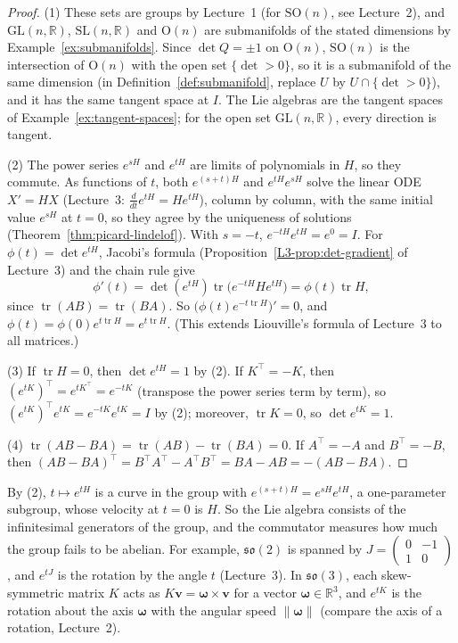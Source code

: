 \documentclass[11pt]{article}
\newcommand{\norm}[1]{\lVert #1 \rVert}
\theoremstyle{definition}
\theoremstyle{plain}
\theoremstyle{remark}
\DeclareMathOperator{\tr}{tr}
\begin{document}
\begin{proof}
    (1) These sets are groups by Lecture~1 (for $\mathrm{SO}(n)$, see Lecture~2), and $\mathrm{GL}(n, \mathbb{R})$, $\mathrm{SL}(n, \mathbb{R})$ and $\mathrm{O}(n)$ are submanifolds of the stated dimensions by Example~\ref{ex:submanifolds}. Since $\det Q = \pm 1$ on $\mathrm{O}(n)$, $\mathrm{SO}(n)$ is the intersection of $\mathrm{O}(n)$ with the open set $\{\det > 0\}$, so it is a submanifold of the same dimension (in Definition~\ref{def:submanifold}, replace $U$ by $U \cap \{\det > 0\}$), and it has the same tangent space at $I$. The Lie algebras are the tangent spaces of Example~\ref{ex:tangent-spaces}; for the open set $\mathrm{GL}(n, \mathbb{R})$, every direction is tangent.

    (2) The power series $e^{sH}$ and $e^{tH}$ are limits of polynomials in $H$, so they commute. As functions of $t$, both $e^{(s+t)H}$ and $e^{tH}e^{sH}$ solve the linear ODE $X' = HX$ (Lecture~3: $\frac{d}{dt}e^{tH} = He^{tH}$), column by column, with the same initial value $e^{sH}$ at $t = 0$, so they agree by the uniqueness of solutions (Theorem~\ref{thm:picard-lindelof}). With $s = -t$, $e^{-tH}e^{tH} = e^0 = I$. For $\phi(t) = \det e^{tH}$, Jacobi's formula (Proposition~\ref{L3-prop:det-gradient} of Lecture~3) and the chain rule give
    \[\phi'(t) = \det(e^{tH})\tr\big(e^{-tH}He^{tH}\big) = \phi(t)\tr H,\]
    since $\tr(AB) = \tr(BA)$. So $\big(\phi(t)e^{-t\tr H}\big)' = 0$, and $\phi(t) = \phi(0)e^{t\tr H} = e^{t\tr H}$. (This extends Liouville's formula of Lecture~3 to all matrices.)

    (3) If $\tr H = 0$, then $\det e^{tH} = 1$ by (2). If $K^\top = -K$, then $(e^{tK})^\top = e^{tK^\top} = e^{-tK}$ (transpose the power series term by term), so $(e^{tK})^\top e^{tK} = e^{-tK}e^{tK} = I$ by (2); moreover, $\tr K = 0$, so $\det e^{tK} = 1$.

    (4) $\tr(AB - BA) = \tr(AB) - \tr(BA) = 0$. If $A^\top = -A$ and $B^\top = -B$, then $(AB - BA)^\top = B^\top A^\top - A^\top B^\top = BA - AB = -(AB - BA)$.
\end{proof}

By (2), $t \mapsto e^{tH}$ is a curve in the group with $e^{(s+t)H} = e^{sH}e^{tH}$, a one-parameter subgroup, whose velocity at $t = 0$ is $H$. So the Lie algebra consists of the infinitesimal generators of the group, and the commutator measures how much the group fails to be abelian. For example, $\mathfrak{so}(2)$ is spanned by $J = \begin{pmatrix} 0 & -1 \\ 1 & 0 \end{pmatrix}$, and $e^{tJ}$ is the rotation by the angle $t$ (Lecture~3). In $\mathfrak{so}(3)$, each skew-symmetric matrix $K$ acts as $K\mathbf{v} = \boldsymbol{\omega} \times \mathbf{v}$ for a vector $\boldsymbol{\omega} \in \mathbb{R}^3$, and $e^{tK}$ is the rotation about the axis $\boldsymbol{\omega}$ with the angular speed $\norm{\boldsymbol{\omega}}$ (compare the axis of a rotation, Lecture~2).
\end{document}
